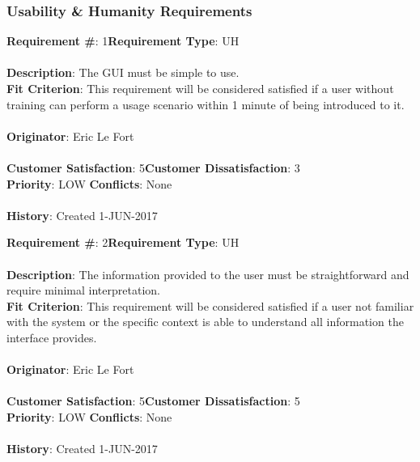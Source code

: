 \documentclass[titlepage]{article}
\begin{document}
\subsubsection{Usability \& Humanity Requirements}
\begin{framed}
	\noindent\textbf{Requirement \#}: 1\hfill \textbf{Requirement Type}: UH\hfill\\\\
	\noindent\textbf{Description}: The GUI must be simple to use.\\
	\textbf{Fit Criterion}: This requirement will be considered satisfied if a user without training can perform a usage scenario within 1 minute of being introduced to it.\\\\
	\textbf{Originator}: Eric Le Fort\\\\
	\noindent\textbf{Customer Satisfaction}: 5\hfill \textbf{Customer Dissatisfaction}: 3\hfill\\
	\textbf{Priority}: LOW \hfill \textbf{Conflicts}: None\hfill\\\\
	\noindent\textbf{History}: Created 1-JUN-2017
\end{framed}
\newpage
\begin{framed}
	\noindent\textbf{Requirement \#}: 2\hfill \textbf{Requirement Type}: UH\hfill\\\\
	\noindent\textbf{Description}: The information provided to the user must be straightforward and require minimal interpretation.\\
	\textbf{Fit Criterion}: This requirement will be considered satisfied if a user not familiar with the system or the specific context is able to understand all information the interface provides.\\\\
	\textbf{Originator}: Eric Le Fort\\\\
	\noindent\textbf{Customer Satisfaction}: 5\hfill \textbf{Customer Dissatisfaction}: 5\hfill\\
	\textbf{Priority}: LOW \hfill \textbf{Conflicts}: None\hfill\\\\
	\noindent\textbf{History}: Created 1-JUN-2017
\end{framed}
\end{document}
